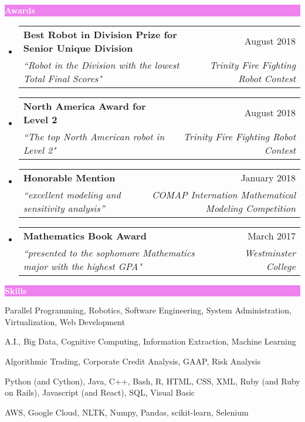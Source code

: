 \documentclass[letterpaper,11pt]{article}
\makeatletter
\newcommand{\resheading}[1]{{\large \colorbox{violet}{\begin{minipage}{\textwidth}{\textbf{#1 \vphantom{p\^{E}}}}\end{minipage}}}}
\newcommand{\ressubheading}[4]{
	\begin{tabular*}{7.0in}{l@{\extracolsep{\fill}}r}
		\textbf{#1} & #2 \\
		\textit{#3} & \textit{#4} \\
	\end{tabular*}\vspace{-6pt}}
\makeatother
\begin{document}
		\resheading{\textcolor{white}{Awards}}

		\begin{itemize}[topsep=3pt, itemsep=1pt]
			\item
			\ressubheading{Best Robot in Division Prize for Senior Unique Division}{August 2018}{``Robot in the Division with the lowest Total Final Scores"}{Trinity Fire Fighting Robot Contest}
			\item
			\ressubheading{North America Award for Level 2}{August 2018}{``The top North American robot in Level 2"}{Trinity Fire Fighting Robot Contest}
			\item
			\ressubheading{Honorable Mention}{January 2018}{``excellent modeling and sensitivity analysis''}{COMAP Internation Mathematical Modeling Competition}
			\item
			\ressubheading{Mathematics Book Award}{March 2017}{``presented to the sophomore Mathematics major with the highest GPA"}{Westminster College}
		\end{itemize}
	
	\resheading{\textcolor{white}{Skills}}
	
	\begin{description}[itemsep=1pt]
		\item[Computer Science:]  Parallel Programming, Robotics, Software Engineering, System Administration, Virtualization, Web Development
		\item[Data Science:] A.I., Big Data, Cognitive Computing, Information Extraction, Machine Learning
		\item[Finance and Economics:] Algorithmic Trading, Corporate Credit Analysis, GAAP, Risk Analysis
		\item[Languages:] Python (and Cython), Java, C++, Bash, R, HTML, CSS, XML, Ruby (and Ruby on Rails), Javascript (and React), SQL, Visual Basic
		\item[Software \& Tools:] AWS, Google Cloud, NLTK, Numpy, Pandas, scikit-learn, Selenium
	\end{description}
	
\end{document}
